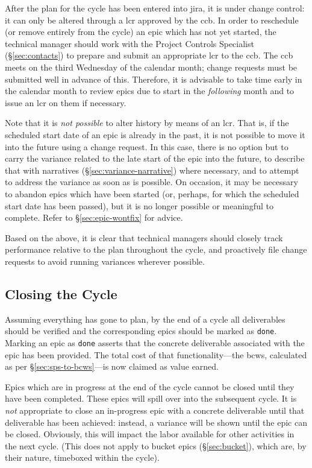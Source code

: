 After the plan for the \gls{cycle} has been entered into \gls{jira}, it is under change control: it can only be altered through a \gls{lcr} approved by the \gls{ccb}.
In order to reschedule (or remove entirely from the \gls{cycle}) an \gls{epic} which has not yet started, the technical manager should work with the Project Controls Specialist (\S\ref{sec:contacts}) to prepare and submit an appropriate \gls{lcr} to the \gls{ccb}.
The \gls{ccb} meets on the third Wednesday of the calendar month; change requests must be submitted well in advance of this.
Therefore, it is advisable to take time early in the calendar month to review \glspl{epic} due to start in the \emph{following} month and to issue an \gls{lcr} on them if necessary.

Note that it is \emph{not possible} to alter history by means of an \gls{lcr}.
That is, if the scheduled start date of an \gls{epic} is already in the past, it is not possible to move it into the future using a change request.
In this case, there is no option but to carry the variance related to the late start of the \gls{epic} into the future, to describe that with narratives (\S\ref{sec:variance-narrative}) where necessary, and to attempt to address the variance as soon as is possible.
On occasion, it may be necessary to abandon \glspl{epic} which have been started (or, perhaps, for which the scheduled start date has been passed), but it is no longer possible or meaningful to complete.
Refer to \S\ref{sec:epic-wontfix} for advice.

Based on the above, it is clear that technical managers should closely track performance relative to the plan throughout the \gls{cycle}, and proactively file change requests to avoid running variances wherever possible.

\subsection{Closing the Cycle}
\label{sec:cycle-close}

Assuming everything has gone to plan, by the end of a \gls{cycle} all deliverables should be verified and the corresponding \glspl{epic} should be marked as \texttt{done}.
Marking an \gls{epic} as \texttt{done} asserts that the concrete deliverable associated with the \gls{epic} has been provided.
The total cost of that functionality---the \gls{bcws}, calculated as per \S\ref{sec:sps-to-bcws}---is now claimed as value earned.

Epics which are in progress at the end of the \gls{cycle} cannot be closed until they have been completed.
These \glspl{epic} will spill over into the subsequent \gls{cycle}.
It is \emph{not} appropriate to close an in-progress \gls{epic} with a concrete deliverable until that deliverable has been achieved: instead, a variance will be shown until the \gls{epic} can be closed.
Obviously, this will impact the labor available for other activities in the next \gls{cycle}.
(This does not apply to bucket \glspl{epic} (\S\ref{sec:bucket}), which are, by their nature, \gls{timebox}ed within the \gls{cycle}).

